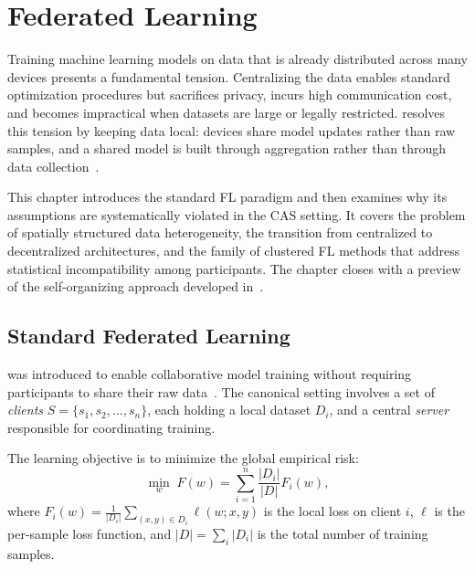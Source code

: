 
\chapter{Federated Learning}
\label{chap:federated-learning}
\minitoc

Training machine learning models on data that is already distributed
 across many devices presents a fundamental tension.
%
Centralizing the data enables standard optimization procedures
 but sacrifices privacy, incurs high communication cost,
 and becomes impractical when datasets are large or legally restricted.
%
 resolves this tension by keeping data local:
 devices share model updates rather than raw samples,
 and a shared model is built through aggregation rather than
 through data collection~\cite{DBLP:conf/aistats/McMahanMRHA17}.

This chapter introduces the standard FL paradigm
 and then examines why its assumptions are systematically violated
 in the \gls{CAS} setting.
%
It covers the problem of spatially structured data heterogeneity,
 the transition from centralized to decentralized architectures,
 and the family of clustered FL methods that address statistical
 incompatibility among participants.
%
The chapter closes with a preview of the self-organizing approach
 developed in~.

\section{Standard Federated Learning}
\label{sec:fl-standard}

 was introduced to enable collaborative model training
 without requiring participants to share their raw data~\cite{DBLP:conf/aistats/McMahanMRHA17}.
%
The canonical setting involves a set of \emph{clients}
 $S = \{s_1, s_2, \ldots, s_n\}$,
 each holding a local dataset $D_i$,
 and a central \emph{server} responsible for coordinating training.

The learning objective is to minimize the global empirical risk:
\begin{equation}
  \min_{w} \; F(w) = \sum_{i=1}^{n} \frac{|D_i|}{|D|} F_i(w),
\end{equation}
where $F_i(w) = \frac{1}{|D_i|} \sum_{(x,y) \in D_i} \ell(w; x, y)$
 is the local loss on client $i$,
 $\ell$ is the per-sample loss function,
 and $|D| = \sum_i |D_i|$ is the total number of training samples.

